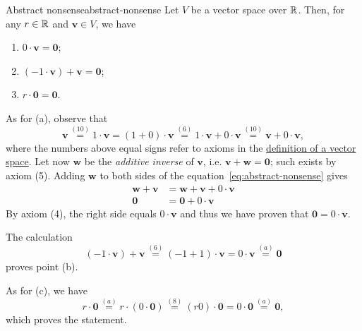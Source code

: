\begin{lemma}{Abstract nonsense}{abstract-nonsense}
 Let $V$ be a vector space over $\mathbb{R}$. Then, for any $r \in \mathbb{R}$ and
 $\mathbf{v} \in V$, we have
 \begin{enumerate}[label=(\alph*)]
  \item $0 \cdot \mathbf{v} = \mathbf{0}$;
  \item $(-1 \cdot \mathbf{v}) + \mathbf{v} = \mathbf{0}$;
  \item $r \cdot \mathbf{0} = \mathbf{0}$.
 \end{enumerate}
\end{lemma}
\begin{lemproof}
 As for (a), observe that
 \begin{equation}
  \label{eq:abstract-nonsense}
  \mathbf{v} \overset{(10)}{=} 1 \cdot \mathbf{v} = (1 + 0) \cdot \mathbf{v}
  \overset{(6)}{=} 1 \cdot \mathbf{v} + 0 \cdot \mathbf{v} \overset{(10)}{=}
  \mathbf{v} + 0 \cdot \mathbf{v}, 
 \end{equation}
 where the numbers above equal signs refer to axioms in the
 \hyperref[def:abstract-vector-space]{definition of a vector space}. Let now
 $\mathbf{w}$ be the \emph{additive inverse} of $\mathbf{v}$, i.e. $\mathbf{v} +
 \mathbf{w} = \mathbf{0}$; such exists by axiom (5). Adding $\mathbf{w}$ to both
 sides of the equation~\eqref{eq:abstract-nonsense} gives
 \begin{align*}
  \mathbf{w} + \mathbf{v} &= \mathbf{w} + \mathbf{v} + 0 \cdot \mathbf{v}\\
  \mathbf{0} &= \mathbf{0} + 0 \cdot \mathbf{v}
 \end{align*}
 By axiom (4), the right side equals $0 \cdot \mathbf{v}$ and thus we have
 proven that $\mathbf{0} = 0 \cdot \mathbf{v}$.

 The calculation
 \[
  (-1 \cdot \mathbf{v}) + \mathbf{v} \overset{(6)}{=} (-1 + 1) \cdot \mathbf{v}
  = 0 \cdot \mathbf{v} \overset{(a)}{=} \mathbf{0}
 \]
 proves point (b).

 As for (c), we have
 \[
  r \cdot \mathbf{0} \overset{(a)}{=} r \cdot (0 \cdot \mathbf{0})
  \overset{(8)}{=} (r 0) \cdot \mathbf{0} = 0 \cdot \mathbf{0} \overset{(a)}{=}
  \mathbf{0},
 \]
 which proves the statement.
\end{lemproof}




